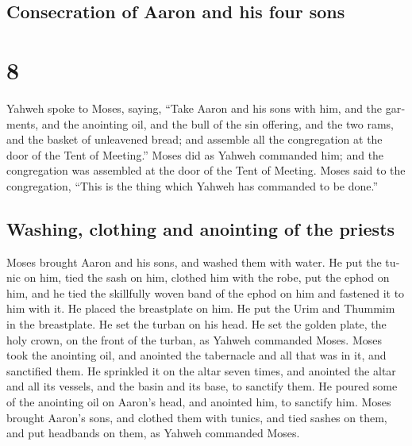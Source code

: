 \begin{paracol}{2}
\switchcolumn
\begin{otherlanguage}{english}

\hypertarget{consecration-of-aaron-and-his-four-sons}{%
\subsection{Consecration of Aaron and his four
sons}\label{consecration-of-aaron-and-his-four-sons}}

\hypertarget{section-15}{%
\section{8}\label{section-15}}

 Yahweh spoke to Moses, saying,  ``Take
Aaron and his sons with him, and the garments, and the anointing oil,
and the bull of the sin offering, and the two rams, and the basket of
unleavened bread;  and assemble all the congregation at
the door of the Tent of Meeting.''  Moses did as Yahweh
commanded him; and the congregation was assembled at the door of the
Tent of Meeting.  Moses said to the congregation, ``This
is the thing which Yahweh has commanded to be done.''

\hypertarget{washing-clothing-and-anointing-of-the-priests}{%
\subsection{Washing, clothing and anointing of the
priests}\label{washing-clothing-and-anointing-of-the-priests}}

 Moses brought Aaron and his sons, and washed them with
water.  He put the tunic on him, tied the sash on him,
clothed him with the robe, put the ephod on him, and he tied the
skillfully woven band of the ephod on him and fastened it to him with
it.  He placed the breastplate on him. He put the Urim and
Thummim in the breastplate.  He set the turban on his
head. He set the golden plate, the holy crown, on the front of the
turban, as Yahweh commanded Moses.  Moses took the
anointing oil, and anointed the tabernacle and all that was in it, and
sanctified them.  He sprinkled it on the altar seven
times, and anointed the altar and all its vessels, and the basin and its
base, to sanctify them.  He poured some of the anointing
oil on Aaron's head, and anointed him, to sanctify him. 
Moses brought Aaron's sons, and clothed them with tunics, and tied
sashes on them, and put headbands on them, as Yahweh commanded Moses.


\end{otherlanguage}
\end{paracol}
